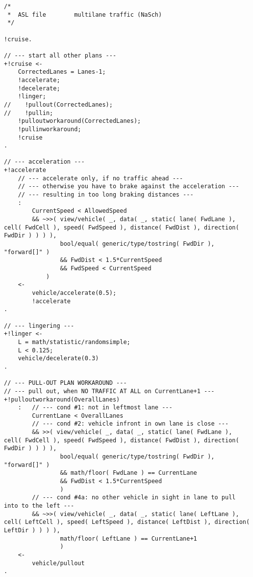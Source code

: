 \begin{lstlisting}[style=asl, 
                   keywords={+!cruise,+!accelerate,+!linger,+!decelerate,+!vehicle/collision,+!pulloutworkaround,+!pullinworkaround}, 
                   keywords={[2]}, 
                   keywords={[3]}, 
                   caption={Agentenscript: NaSch-Modell, mehrspurig},
                   label={lst:multi-lane}]      
/*
 *  ASL file        multilane traffic (NaSch)
 */

!cruise.

// --- start all other plans ---
+!cruise <-
    CorrectedLanes = Lanes-1;
    !accelerate;
    !decelerate;
    !linger;
//    !pullout(CorrectedLanes);
//    !pullin;
    !pulloutworkaround(CorrectedLanes);
    !pullinworkaround;
    !cruise
.

// --- acceleration ---
+!accelerate
    // --- accelerate only, if no traffic ahead ---
    // --- otherwise you have to brake against the acceleration ---
    // --- resulting in too long braking distances ---
    : 
        CurrentSpeed < AllowedSpeed
        && ~>>( view/vehicle( _, data( _, static( lane( FwdLane ), cell( FwdCell ), speed( FwdSpeed ), distance( FwdDist ), direction( FwdDir ) ) ) ),
                bool/equal( generic/type/tostring( FwdDir ), "forward[]" )
                && FwdDist < 1.5*CurrentSpeed
                && FwdSpeed < CurrentSpeed
            )
    <-
        vehicle/accelerate(0.5);
        !accelerate
.

// --- lingering ---
+!linger <-
    L = math/statistic/randomsimple;
    L < 0.125;
    vehicle/decelerate(0.3)
.

// --- PULL-OUT PLAN WORKAROUND ---
// --- pull out, when NO TRAFFIC AT ALL on CurrentLane+1 --- 
+!pulloutworkaround(OverallLanes)
    :   // --- cond #1: not in leftmost lane ---
        CurrentLane < OverallLanes 
        // --- cond #2: vehicle infront in own lane is close ---
        && >>( view/vehicle( _, data( _, static( lane( FwdLane ), cell( FwdCell ), speed( FwdSpeed ), distance( FwdDist ), direction( FwdDir ) ) ) ), 
                bool/equal( generic/type/tostring( FwdDir ), "forward[]" ) 
                && math/floor( FwdLane ) == CurrentLane
                && FwdDist < 1.5*CurrentSpeed 
                )
        // --- cond #4a: no other vehicle in sight in lane to pull into to the left ---
        && ~>>( view/vehicle( _, data( _, static( lane( LeftLane ), cell( LeftCell ), speed( LeftSpeed ), distance( LeftDist ), direction( LeftDir ) ) ) ),
                math/floor( LeftLane ) == CurrentLane+1 
                )
    <-
        vehicle/pullout
.


\end{lstlisting}
